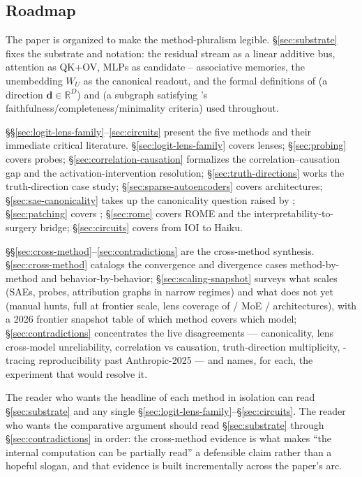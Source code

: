 \subsection{Roadmap}
\label{sec:roadmap}

The paper is organized to make the method-pluralism legible.
\S\ref{sec:substrate} fixes the substrate and notation: the residual
stream as a linear additive bus, attention as QK+OV, MLPs as candidate
-- associative memories, the unembedding $W_U$ as the
canonical readout, and the formal definitions of \emph{} (a
direction $\mathbf{d} \in \mathbb{R}^D$) and \emph{} (a
subgraph satisfying \citet{wang2022-ioi}'s
faithfulness/completeness/minimality criteria) used throughout.

\S\S\ref{sec:logit-lens-family}--\ref{sec:circuits} present the five
methods and their immediate critical literature.
\S\ref{sec:logit-lens-family} covers lenses; \S\ref{sec:probing}
covers probes; \S\ref{sec:correlation-causation} formalizes the
correlation--causation gap and the activation-intervention
resolution; \S\ref{sec:truth-directions} works the truth-direction
case study; \S\ref{sec:sparse-autoencoders} covers  architectures;
\S\ref{sec:sae-canonicality} takes up the canonicality question raised
by \citet{leask2025-sae-not-canonical}; \S\ref{sec:patching} covers
; \S\ref{sec:rome} covers ROME and the
interpretability-to-surgery bridge; \S\ref{sec:circuits} covers
 from IOI to Haiku.

\S\S\ref{sec:cross-method}--\ref{sec:contradictions} are the
cross-method synthesis. \S\ref{sec:cross-method} catalogs the
convergence and divergence cases method-by-method and behavior-by-behavior;
\S\ref{sec:scaling-snapshot} surveys what scales (SAEs, probes,
attribution graphs in narrow regimes) and what does not yet (manual
 hunts, full  at frontier scale, lens
coverage of  / MoE /  architectures), with a 2026 frontier
snapshot table of which method covers which model;
\S\ref{sec:contradictions} concentrates the live disagreements ---
 canonicality, lens cross-model unreliability,  correlation
vs causation, truth-direction multiplicity, -tracing
reproducibility past Anthropic-2025 --- and names, for each, the
experiment that would resolve it.

The reader who wants the headline of each method in isolation can
read \S\ref{sec:substrate} and any single
\S\ref{sec:logit-lens-family}--\S\ref{sec:circuits}. The reader who
wants the comparative argument should read
\S\ref{sec:substrate} through \S\ref{sec:contradictions} in order:
the cross-method evidence is what makes ``the internal computation
can be partially read'' a defensible claim rather than a hopeful
slogan, and that evidence is built incrementally across the paper's
arc.
